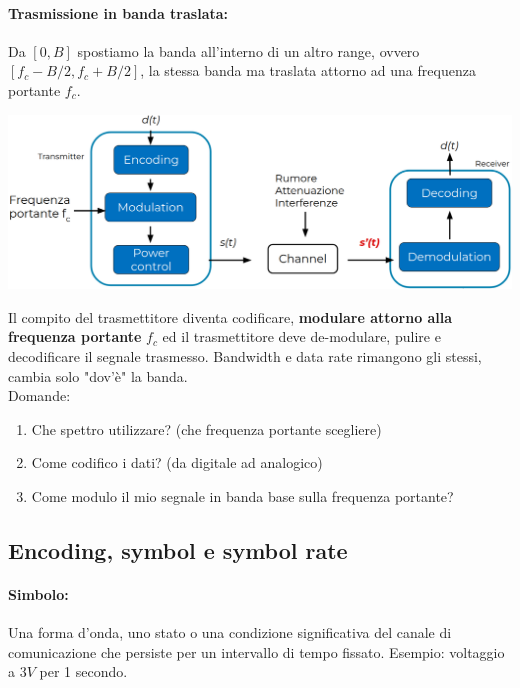 \newpage

\paragraph{Trasmissione in banda traslata:} Da $[0,B]$ spostiamo la banda all'interno di un altro range, ovvero $[f_c - B/2, f_c + B/2]$, la stessa banda ma traslata attorno ad una frequenza portante $f_c$.
\begin{center}
	\includegraphics[width=0.95\linewidth]{img/wireless/bandatraslata1}
\end{center}
Il compito del trasmettitore diventa codificare, \textbf{modulare attorno alla frequenza portante} $f_c$ ed il trasmettitore deve de-modulare, pulire e decodificare il segnale trasmesso. Bandwidth e data rate rimangono gli stessi, cambia solo "dov'è" la banda.\\

Domande: 
\begin{enumerate}
	\item Che spettro utilizzare? (che frequenza portante scegliere)
	\item Come codifico i dati? (da digitale ad analogico)
	\item Come modulo il mio segnale in banda base sulla frequenza portante?
\end{enumerate}

\newpage

\subsection{Encoding, symbol e symbol rate}

\paragraph{Simbolo:} Una forma d'onda, uno stato o una condizione significativa del canale di comunicazione che persiste per un intervallo di tempo fissato. Esempio: voltaggio a $3V$ per 1 secondo.\\

